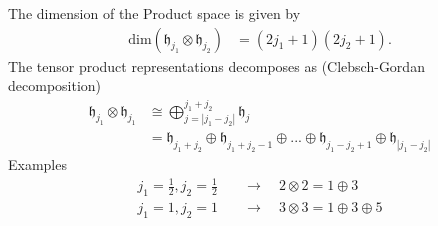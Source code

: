 \documentclass[10pt,a4paper]{article}
\theoremstyle{definition}
\begin{document}
The dimension of the Product space is given by
\begin{align}
\text{dim}(\mathfrak{h}_{j_1} \otimes \mathfrak{h}_{j_2})&=(2j_1+1)(2j_2+1).
\end{align}
The tensor product representations decomposes as ({\sc Clebsch-Gordan} decomposition)
\begin{align}
    \mathfrak{h}_{j_1} \otimes \mathfrak{h}_{j_1} &\cong \bigoplus_{j=|j_1-j_2|}^{j_1+j_2} \mathfrak{h}_{j}\\
    &=\mathfrak{h}_{j_1+j_2}\oplus \mathfrak{h}_{j_1+j_2-1}\oplus ... \oplus \mathfrak{h}_{j_1-j_2+1}\oplus \mathfrak{h}_{|j_1-j_2|}
\end{align}
Examples
\begin{align}
j_1=\frac{1}{2}, j_2=\frac{1}{2}&\quad\rightarrow\quad 2\otimes2=1\oplus3\\
j_1=1, j_2=1&\quad\rightarrow\quad 3\otimes3=1\oplus3\oplus5
\end{align}
\end{document}
